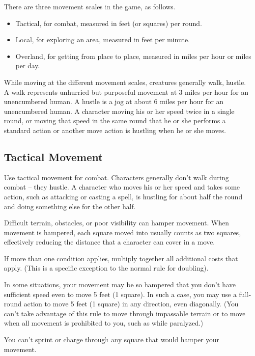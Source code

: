There are three movement scales in the game, as follows.
\begin{itemize}
\item Tactical, for combat, measured in feet (or squares) per round.
\item Local, for exploring an area, measured in feet per minute.
\item Overland, for getting from place to place, measured in miles per
hour or miles per day.
\end{itemize}

 While moving at the different movement scales, creatures generally walk, hustle.
 A walk represents unhurried but purposeful movement at 3 miles per hour for an unencumbered human.
 A hustle is a jog at about 6 miles per hour for an unencumbered human. A character moving his or her
speed twice in a single round, or moving that speed in the same round that he or she performs a standard action or another move action is hustling when he or she moves.

\subsection{Tactical Movement}
Use tactical movement for combat. Characters generally don't walk during combat -- they hustle. A character who
moves his or her speed and takes some action, such as attacking or casting a spell, is hustling for about half the round and doing something else for the other half.

 Difficult terrain, obstacles, or poor visibility can hamper movement. When movement is
hampered, each square moved into usually counts as two squares, effectively reducing the distance that a character
can cover in a move.

If more than one condition applies, multiply together all additional costs that apply. (This is a specific exception to the normal rule for doubling).

In some situations, your movement may be so hampered that you don't have sufficient speed even to move 5 feet (1 square). In such a case, you may use a full-round action to move 5 feet (1 square) in any direction, even diagonally. (You can't take advantage of this rule to move through impassable terrain or to move when all movement is prohibited to you, such as while paralyzed.)

You can't sprint or charge through any square that would hamper your movement.


